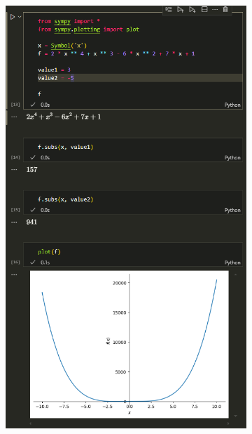 \documentclass[14pt,a4paper]{extarticle}
\begin{document}
\begin{figure}[!ht]
    \centering
    \begin{subfigure}{.5\textwidth}
        \centering
        \includegraphics[width=0.9\linewidth]{figures/1.1 (3).png}
        \label{fig:1.1(3)}
    \end{subfigure}%
    \begin{subfigure}{.5\textwidth}
        \centering

\end{subfigure}
\end{figure}
\end{document}
